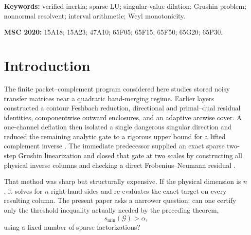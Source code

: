 \documentclass[11pt]{article}
\theoremstyle{definition}
\theoremstyle{remark}
\newcommand{\Gmat}{\mathcal G}
\begin{document}
\begin{abstract}
The result is finite-dimensional and local to three archived scales.  It
does not prove a full-contour root count, a continuum limit, a
Hilbert--P\'olya construction, an identification with zeta zeros, or the
Riemann hypothesis.
\end{abstract}

\noindent\textbf{Keywords:} verified inertia; sparse LU; singular-value
dilation; Grushin problem; nonnormal resolvent; interval arithmetic;
Weyl monotonicity.

\medskip
\noindent\textbf{MSC 2020:} 15A18; 15A23; 47A10; 65F05; 65F15; 65F50;
65G20; 65P30.


\section{Introduction}
\label{sec:introduction}

The finite packet--complement program considered here studies stored noisy
transfer matrices near a quadratic band-merging regime.  Earlier layers
constructed a contour Feshbach reduction, directional and primal--dual
residual identities, componentwise outward enclosures, and an adaptive
arcwise cover.  A one-channel deflation then isolated a single dangerous
singular direction and reduced the remaining analytic gate to a rigorous
upper bound for a lifted complement inverse
\citep{WangDeflated2026}.  The immediate predecessor supplied an exact
sparse two-step Grushin linearization and closed that gate at two scales by
constructing all physical inverse columns and checking a direct
Frobenius--Neumann residual \citep{WangSparseGrushin2026}.

That method was sharp but structurally expensive.  If the physical dimension
is $n$, it solves for $n$ right-hand sides and re-evaluates the exact target
on every resulting column.  The present paper asks a narrower question:
can one certify only the threshold inequality actually needed by the
preceding theorem,
\begin{equation}
 s_{\min}(\Gmat)>\alpha,
 \label{eq:intro-threshold}
\end{equation}
using a fixed number of sparse factorizations?
\end{document}

